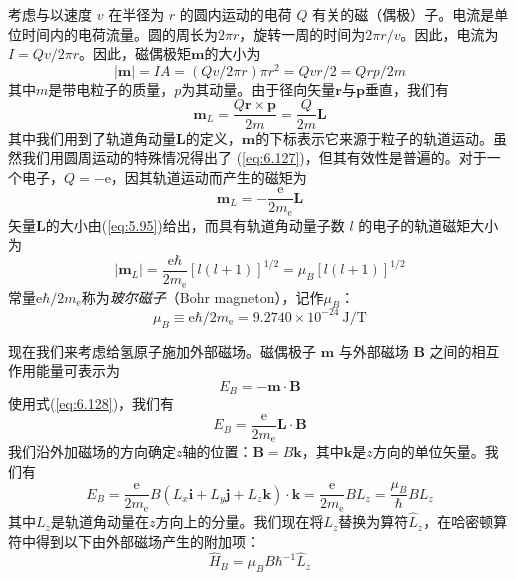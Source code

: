     考虑与以速度 $v$ 在半径为 $r$ 的圆内运动的电荷 $Q$ 有关的磁（偶极）子。电流是单位时间内的电荷流量。圆的周长为$2\pi r$，旋转一周的时间为$2\pi r/v$。因此，电流为$I = Qv/2\pi r$。因此，磁偶极矩$\mathbf{m}$的大小为
    \begin{equation}
        \left|\mathbf{m}\right| = IA = \left(Qv/2\pi r\right)\pi r^2 = Qvr/2 = Qrp/2m
        \label{eq:6.126}
    \end{equation}
    其中$m$是带电粒子的质量，$p$为其动量。由于径向矢量$\mathbf{r}$与$\mathbf{p}$垂直，我们有
    \begin{equation}
        \mathbf{m}_L = \frac{Q\mathbf{r}\times\mathbf{p}}{2m} = \frac{Q}{2m}\mathbf{L}
        \label{eq:6.127}
    \end{equation}
    其中我们用到了轨道角动量$\mathbf{L}$的定义，$\mathbf{m}$的下标表示它来源于粒子的轨道运动。虽然我们用圆周运动的特殊情况得出了 (\ref{eq:6.127})，但其有效性是普遍的。对于一个电子，$Q = -\mathrm{e}$，因其轨道运动而产生的磁矩为
    \begin{equation}
        \mathbf{m}_L = -\frac{\mathrm{e}}{2m_{\mathrm{e}}}\mathbf{L}
        \label{eq:6.128}
    \end{equation}
    矢量$\mathbf{L}$的大小由(\ref{eq:5.95})给出，而具有轨道角动量子数 $l$ 的电子的轨道磁矩大小为
    \begin{equation}
        \left|\mathbf{m}_L\right| = \frac{\mathrm{e}\hbar}{2m_{\mathrm{e}}}\left[l\left(l+1\right)\right]^{1/2} = \mu_{B}\left[l\left(l+1\right)\right]^{1/2}
        \label{eq:6.129}
    \end{equation}
    常量$\mathrm{e}\hbar/2m_{\mathrm{e}}$称为\textit{玻尔磁子}（Bohr magneton），记作$\mu_{B}$：
    \begin{equation}
        \mu_{B} \equiv \mathrm{e}\hbar/2m_{\mathrm{e}} = 9.2740 \times 10^{-24}\: \mathrm{J}/\mathrm{T}
        \label{eq:6.130}
    \end{equation}

    现在我们来考虑给氢原子施加外部磁场。磁偶极子 $\mathbf{m}$ 与外部磁场 $\mathbf{B}$ 之间的相互作用能量可表示为
    \begin{equation}
        E_B = -\mathbf{m}\cdot\mathbf{B}
        \label{eq:6.131}
    \end{equation}
    使用式(\ref{eq:6.128})，我们有
    \begin{equation}
        E_{B} = \frac{\mathrm{e}}{2m_{\mathrm{e}}}\mathbf{L}\cdot\mathbf{B}
        \label{eq:6.132}
    \end{equation}
    我们沿外加磁场的方向确定$z$轴的位置：$\mathbf{B} = B\mathbf{k}$，其中$\mathbf{k}$是$z$方向的单位矢量。我们有
    \begin{equation*}
        E_B = \frac{\mathrm{e}}{2m_{\mathrm{e}}}B\left(L_x\mathbf{i} + L_y\mathbf{j} + L_z\mathbf{k}\right)\cdot\mathbf{k} = \frac{\mathrm{e}}{2m_{\mathrm{e}}}BL_z = \frac{\mu_B}{\hbar}BL_z
    \end{equation*}
    其中$L_z$是轨道角动量在$z$方向上的分量。我们现在将$L_z$替换为算符$\hat{L}_z$，在哈密顿算符中得到以下由外部磁场产生的附加项：
    \begin{equation}
        \hat{H}_B = \mu_BB\hbar^{-1}\hat{L}_z
        \label{eq:6.133}
    \end{equation}

